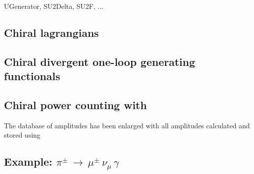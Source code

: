 
UGenerator, SU2Delta, SU2F, ...

\subsection{Chiral lagrangians}
\label{chptLags}

\subsection{Chiral divergent one-loop generating functionals}

\subsection{Chiral power counting with \fa}

The database of amplitudes has been enlarged with all amplitudes calculated and stored using 

\subsection{Example:\; $\pi^\pm \, \rightarrow  \, \mu^\pm \, \nu_\mu \, \gamma$}

